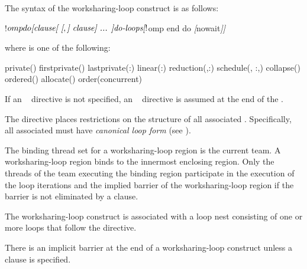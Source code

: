 \begin{fortranspecific}
The syntax of the worksharing-loop construct is as follows:

\begin{ompfPragma}
!$omp do \plc{[clause[ [},\plc{] clause] ... ]}
   \plc{do-loops}
\textsl{[}!$omp end do \textsl{[}nowait\textsl{]]}
\end{ompfPragma}

where  is one of the following:

{}
\begin{indentedcodelist}
private()
firstprivate()
lastprivate(\plc{[ lastprivate-modifier}:\plc{] list})
linear(\plc{list[ }:\plc{ linear-step]})
reduction(\plc{[ reduction-modifier},\plc{]reduction-identifier }:)
schedule(\plc{[modifier [}, \plc{modifier]}:\plc{]kind[},\plc{ chunk_size]})
collapse()
ordered\plc{[}()\plc{]}
allocate(\plc{[allocator: ]})
order(concurrent)
\end{indentedcodelist}

If an ~ directive is not specified, an ~ directive is assumed at the end of the
.

The  directive places restrictions on the structure of all
associated .  Specifically, all associated  must
have \emph{canonical loop form} (see ).

\end{fortranspecific}


\binding
The binding thread set for a worksharing-loop region is the current team. A
worksharing-loop region binds to the
innermost enclosing  region. Only the threads of the team executing the
binding  region participate in the execution of the loop iterations and the
implied barrier of the worksharing-loop region if the barrier is not eliminated by a  clause.

\descr
The worksharing-loop construct is associated with a loop nest consisting of one or more loops that
follow the directive.

There is an implicit barrier at the end of a worksharing-loop construct unless a  clause is
specified.

